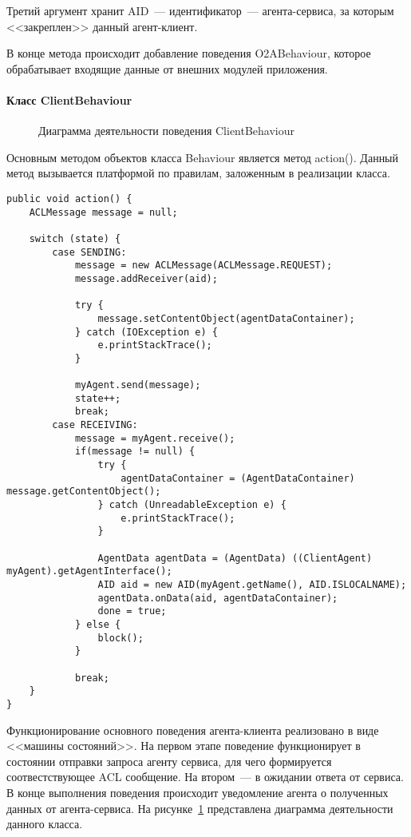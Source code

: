 Третий аргумент хранит AID~--- идентификатор~--- агента-сервиса, за которым <<закреплен>> данный агент-клиент.

В конце метода происходит добавление поведения O2ABehaviour, которое обрабатывает входящие данные от внешних модулей приложения.

\paragraph{Класс ClientBehaviour}
\begin{figure}[h!]
\caption{Диаграмма деятельности поведения ClientBehaviour}
\label{3:client-beh}
\end{figure}
Основным методом объектов класса Behaviour является метод action(). Данный метод вызывается платформой по правилам, заложенным в реализации класса.

\begin{verbatim}
public void action() {
    ACLMessage message = null;

    switch (state) {
        case SENDING:
            message = new ACLMessage(ACLMessage.REQUEST);
            message.addReceiver(aid);

            try {
                message.setContentObject(agentDataContainer);
            } catch (IOException e) {
                e.printStackTrace();
            }

            myAgent.send(message);
            state++;
            break;
        case RECEIVING:
            message = myAgent.receive();
            if(message != null) {
                try {
                    agentDataContainer = (AgentDataContainer) message.getContentObject();
                } catch (UnreadableException e) {
                    e.printStackTrace();
                }

                AgentData agentData = (AgentData) ((ClientAgent) myAgent).getAgentInterface();
                AID aid = new AID(myAgent.getName(), AID.ISLOCALNAME);
                agentData.onData(aid, agentDataContainer);
                done = true;
            } else {
                block();
            }

            break;
    }
}
\end{verbatim}
Функционирование основного поведения агента-клиента реализовано в виде <<машины состояний>>. На первом этапе поведение функционирует в состоянии отправки запроса агенту сервиса, для чего формируется соотвестствующее ACL сообщение. На втором~--- в ожидании ответа от сервиса. В конце выполнения поведения происходит уведомление агента о полученных данных от агента-сервиса.
На рисунке~\ref{3:client-beh} представлена диаграмма деятельности данного класса.

